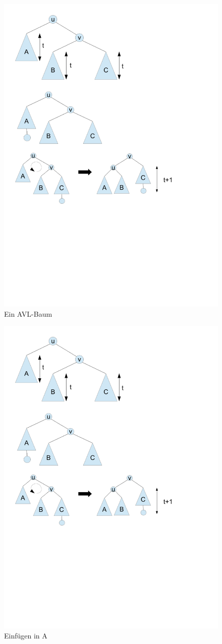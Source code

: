 \documentclass[a4paper,twoside,10pt]{report}
\begin{document}
\begin{figure}[H]\center
\includegraphics[trim= 1cm 22cm 9cm 1cm,clip,width=.7\columnwidth]{figures/avlins.pdf}
\caption{Ein AVL-Baum}
\end{figure}
\begin{figure}[H]\center
\includegraphics[trim= 1cm 16cm 11cm 8cm,clip,width=.7\columnwidth]{figures/avlins.pdf}
\caption{Einfügen in A}
\end{figure}
\end{document}
